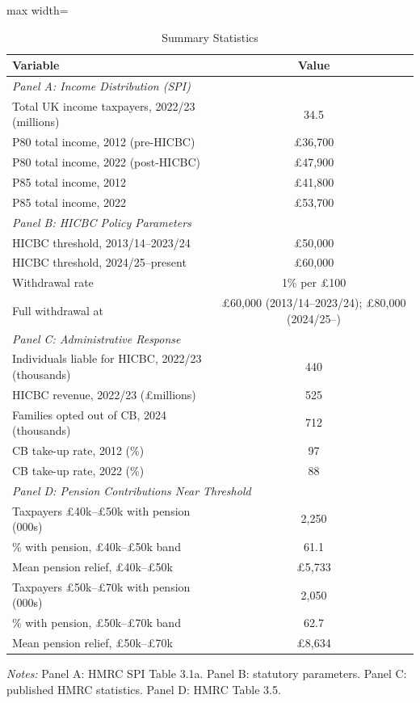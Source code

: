 \documentclass[12pt]{article}
\begin{document}
\begin{table}[H]
\centering
\caption{Summary Statistics}
\label{tab:summary}
\begin{adjustbox}{max width=\textwidth}
\begin{tabular}{lc}
\toprule
Variable & Value \\
\midrule
\multicolumn{2}{l}{\emph{Panel A: Income Distribution (SPI)}} \\
Total UK income taxpayers, 2022/23 (millions) & 34.5 \\
P80 total income, 2012 (pre-HICBC) & \pounds36,700 \\
P80 total income, 2022 (post-HICBC) & \pounds47,900 \\
P85 total income, 2012 & \pounds41,800 \\
P85 total income, 2022 & \pounds53,700 \\[0.5em]
\multicolumn{2}{l}{\emph{Panel B: HICBC Policy Parameters}} \\
HICBC threshold, 2013/14--2023/24 & \pounds50,000 \\
HICBC threshold, 2024/25--present & \pounds60,000 \\
Withdrawal rate & 1\% per \pounds100 \\
Full withdrawal at & \pounds60,000 (2013/14--2023/24); \pounds80,000 (2024/25--) \\[0.5em]
\multicolumn{2}{l}{\emph{Panel C: Administrative Response}} \\
Individuals liable for HICBC, 2022/23 (thousands) & 440 \\
HICBC revenue, 2022/23 (\pounds millions) & 525 \\
Families opted out of CB, 2024 (thousands) & 712 \\
CB take-up rate, 2012 (\%) & 97 \\
CB take-up rate, 2022 (\%) & 88 \\[0.5em]
\multicolumn{2}{l}{\emph{Panel D: Pension Contributions Near Threshold}} \\
Taxpayers \pounds40k--\pounds50k with pension (000s) & 2,250 \\
\% with pension, \pounds40k--\pounds50k band & 61.1 \\
Mean pension relief, \pounds40k--\pounds50k & \pounds5,733 \\
Taxpayers \pounds50k--\pounds70k with pension (000s) & 2,050 \\
\% with pension, \pounds50k--\pounds70k band & 62.7 \\
Mean pension relief, \pounds50k--\pounds70k & \pounds8,634 \\
\bottomrule
\end{tabular}
\end{adjustbox}
\par\vspace{0.3em}
{\footnotesize \emph{Notes:} Panel A: HMRC SPI Table 3.1a. Panel B: statutory parameters. Panel C: published HMRC statistics. Panel D: HMRC Table 3.5.}
\end{table}
\end{document}
